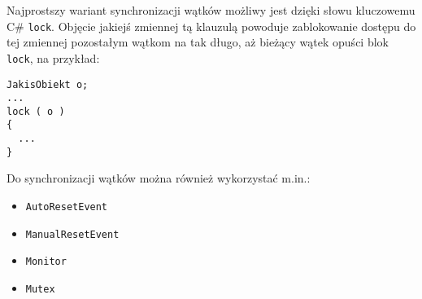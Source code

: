 Najprostszy wariant synchronizacji wątków możliwy jest dzięki słowu kluczowemu C\# {\tt lock}. 
Objęcie jakiejś zmiennej tą klauzulą powoduje zablokowanie dostępu do tej zmiennej pozostałym wątkom na
tak długo, aż bieżący wątek opuści blok {\tt lock}, na przykład:

\begin{scriptsize}
\begin{verbatim}
JakisObiekt o; 
...
lock ( o )
{
  ...
}
\end{verbatim}
\end{scriptsize}

Do synchronizacji wątków można również wykorzystać m.in.:
\begin{itemize}
\item {\tt AutoResetEvent}
\item {\tt ManualResetEvent}
\item {\tt Monitor}
\item {\tt Mutex}
\end{itemize}

